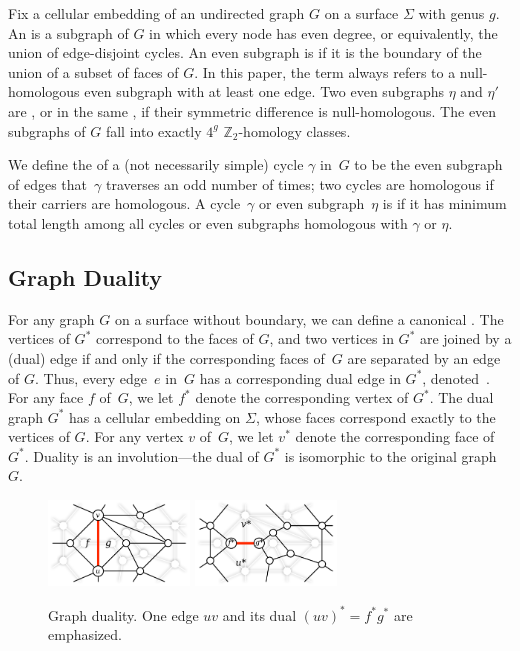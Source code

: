 \documentclass[twoside,leqno,twocolumn]{article}
\def\Z{\mathbb{Z}}
\let\cycle\gamma
\begin{document}
Fix a cellular embedding of an undirected graph $G$ on a surface $\Sigma$ with genus $g$.  An  is a subgraph of $G$ in which every node has even degree, or equivalently, the union of edge-disjoint cycles.  An even subgraph is  if it is the boundary of the union of a subset of faces of $G$.  In this paper, the term  always refers to a null-homologous even subgraph with at least one edge.  Two even subgraphs $\eta$ and $\eta'$ are , or in the same , if their symmetric difference  is null-homologous.  The even subgraphs of $G$ fall into exactly $4^g$ $\Z_2$-homology classes.

We define the  of a (not necessarily simple) cycle $\cycle$ in~$G$ to be the even subgraph of edges that~$\cycle$ traverses an odd number of times; two cycles are homologous if their carriers are homologous.  A cycle~$\cycle$ or even subgraph~$\eta$ is \EMPH{$\Z_2$-minimal} if it has minimum total length among all cycles or even subgraphs homologous with $\cycle$ or $\eta$.


\subsection{Graph Duality}

For any graph $G$ on a surface without boundary, we can define a canonical .  The vertices of $G^*$ correspond to the faces of $G$, and two vertices in $G^*$ are joined by a (dual) edge if and only if the corresponding faces of~$G$ are separated by an edge of $G$.  Thus, every edge~$e$ in~$G$ has a corresponding dual edge in $G^*$, denoted~.  For any face $f$ of~$G$, we let $f^*$ denote the corresponding vertex of $G^*$.  The dual graph $G^*$ has a cellular embedding on $\Sigma$, whose faces correspond exactly to the vertices of $G$.  For any vertex $v$ of~$G$, we let $v^*$ denote the corresponding face of $G^*$.  Duality is an involution---the dual of $G^*$ is isomorphic to the original graph~$G$.

\begin{figure}[htb]
\centering
\includegraphics[height=0.9in]{Fig/primal}\quad
\includegraphics[height=0.9in]{Fig/dual}
\caption{Graph duality.  One edge $uv$ and its dual $(uv)^* =
f^*g^*$ are emphasized.} \label{F:primaldual}
\end{figure}
\end{document}
